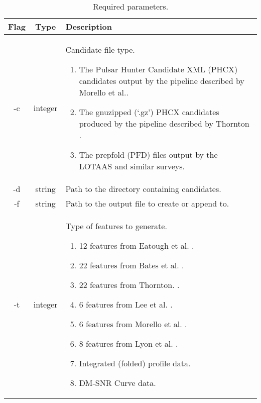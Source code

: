 \documentclass[twoside,a4paper]{refart}
\begin{document}
\begin{table}[h]
\begin{tabular}{|c|c|p{7cm}|}
\hline
Flag & Type    & Description                                     \\ \hline\hline
-c   & integer & Candidate file type. 
				\begin{enumerate}
				 \item The Pulsar Hunter Candidate XML (PHCX) candidates output by the pipeline described by Morello et al.\cite{Morello:2014:eb}.
				 \item The gnuzipped (`.gz') PHCX candidates produced by the pipeline described by Thornton \cite{ThorntonPhD:1}.
				 \item The prepfold (PFD) files output by the LOTAAS and similar surveys.
				\end{enumerate}                           \\ \hline
-d   & string  & Path to the directory containing candidates.    \\ \hline
-f   & string  & Path to the output file to create or append to. \\ \hline
-t   & integer & Type of features to generate.
				\begin{enumerate}
				\item 12 features from Eatough et al. \cite{Eatough:2010:uz}.
				\item 22 features from Bates et al. \cite{Bates:2012:mb}.
				\item 22 features from Thornton. \cite{ThorntonPhD:1}.
				\item 6 features from  Lee et al. \cite{Lee:2013:sk}.
				\item 6 features from Morello et al. \cite{Morello:2014:eb}.
				\item 8 features from Lyon et al. \cite{Lyon:2015:jk}.
				\item Integrated (folded) profile data.
				\item DM-SNR Curve data.
				\end{enumerate}				   \\ \hline
\end{tabular}
\caption[]{Required parameters.}
\label{tab:requiredParameters}
\end{table}\newpage
\end{document}
